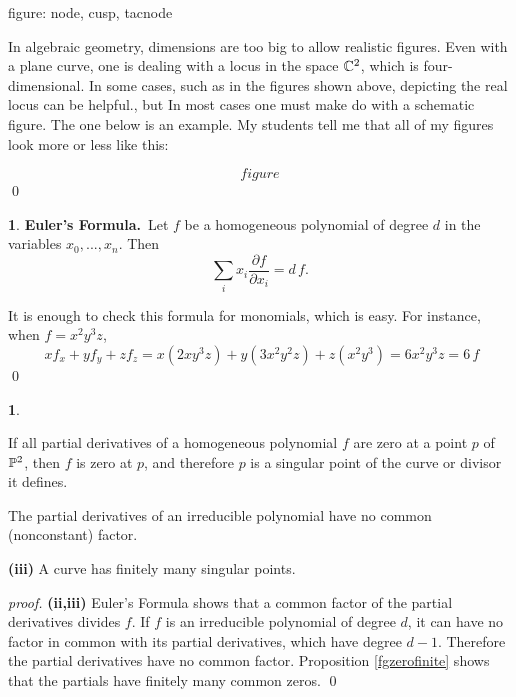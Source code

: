 \documentclass[leqno]{book}
\newcommand\Marginnote[1]{\marginnote{\hspace{-12pt}\normalfont{#1}}}
\theoremstyle{definition}%
\numberwithin{equation}{section}
\newtheorem{thm}[equation]{}
\theoremstyle{theorem} %
\newtheorem{corollary}[equation]{}
\renewenvironment{proof}{\no \emph{proof.}}{}
\begin{document}
\ms \centerline{figure: node, cusp,
  tacnode}\label{somesingpts}



 In algebraic geometry, dimensions
are too big to allow realistic figures.  Even with a plane curve, one
is dealing with a locus in the space $\mathbb{C}^2$, which is
four-dimensional.  In some cases, such as in the figures shown above,
depicting the real locus can be helpful., but  In most cases one must
make do with a schematic figure.  The one below is an example.  My
students tell me that all of my figures look more or less like this:

$$figure$$\qed




 \begin{thm}{\bf Euler's Formula.}\Marginnote{eulerformula}\;\,
Let $f$ be a homogeneous polynomial of degree $d$ in the variables
$x_0,...,x_n$.  
Then
\label{eulerformula}
$$\sum_i x_i\textstyle{\frac{\partial f}{\partial x_i}} = d\,f.$$
\end{thm}

\no It is enough to check this formula for monomials, which is
easy.  For instance, when $f = x^2y^3z$, $$\;xf_x + y f_y + zf_z =
x(2xy^3z) + y(3x^2y^2z) + z(x^2y^3) = 6x^2y^3z = 6\,f$$ 
\hspace{-0.7cm}\qed

 \begin{corollary}{}\Marginnote{singpointoncurve}\;\,

 If all partial derivatives of a homogeneous polynomial
$f$ are zero at a point $p$ of $\mathbb{P}^2$, then $f$ is zero at $p$, and
therefore $p$ is a singular point of the curve or divisor it defines.

 The partial derivatives of an irreducible polynomial
have no common (nonconstant) factor.

\no
{\bf (iii)} A curve has  finitely many singular points.
\label{singpointoncurve}\end{corollary}

\begin{proof} {\bf (ii,iii)}  
Euler's Formula shows that a common factor of the partial derivatives
divides $f$.  If $f$ is an irreducible polynomial of degree $d$, it
can have no factor in common with its partial derivatives, which have
degree $d\!-\!1$.  Therefore the partial derivatives have no common
factor.  Proposition \ref{fgzerofinite} shows that the partials  have
finitely many common zeros.  \qed\end{proof}
\end{document}
